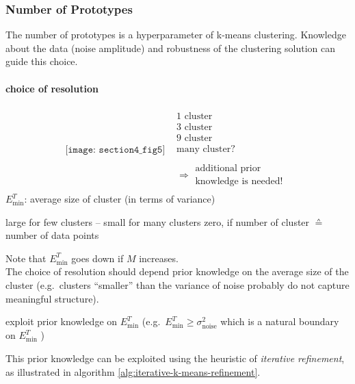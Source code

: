 \subsubsection{Number of Prototypes}
The number of prototypes is a hyperparameter of k-means clustering. Knowledge about the data (noise amplitude) and robustness of the clustering solution can guide this choice. 

\paragraph{choice of resolution}
\[ \begin{array}{ll}
	\texttt{[image: section4\_fig5]}
	& \begin{array}{l}
		\text{1 cluster} \\
		\text{3 cluster} \\
		\text{9 cluster} \\
		\text{many cluster?} \\\\
		\Rightarrow \substack{	\text{additional prior} \\
					\text{knowledge is needed!}}
	\end{array}
\end{array} \]
$E_{\min}^T$: average size of cluster (in terms of variance)
\begin{itemize}
	\itl large for few clusters -- small for many clusters
	\itl zero, if number of cluster $\corresponds$ number of data points
\end{itemize}
Note that $E^T_\mathrm{min}$ goes down if $M$ increases.
\\

The choice of resolution should depend prior knowledge on the average
size of the cluster (e.g.\ clusters ``smaller'' than the variance of noise probably do not capture meaningful structure). 
\begin{itemize}
	\itr exploit prior knowledge on $E_{\min}^T$ 
        (e.g.\ $E_{\min}^T \geq \sigma_\mathrm{noise}^2$ which is a natural boundary on 
        $E^T_\mathrm{min}$ )
\end{itemize}
This prior knowledge can be exploited using the heuristic of
\emph{iterative refinement}, as illustrated in algorithm \ref{alg:iterative-k-means-refinement}.

